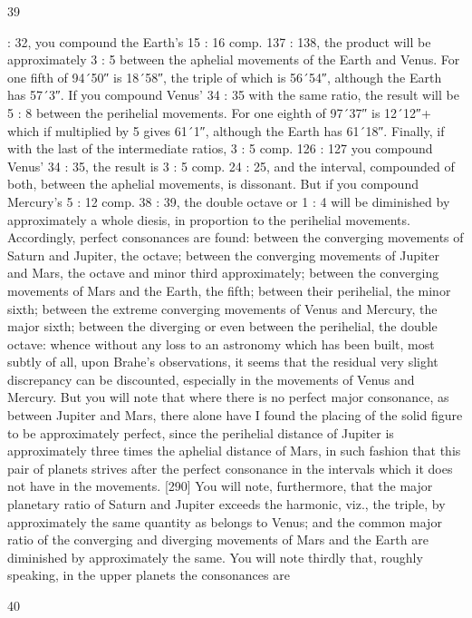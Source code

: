 \documentclass{article}
\begin{document}
39

: 32, you compound the Earth's 15 : 16 comp. 137 : 138, the product will
be approximately 3 : 5 between the aphelial movements of the Earth and
Venus. For one fifth of 94´50″ is 18´58″, the triple of which is 56´54″,
although the Earth has 57´3″. If you compound Venus’ 34 : 35 with the
same ratio, the result will be 5 : 8 between the perihelial movements. For
one eighth of 97´37″ is 12´12″+ which if multiplied by 5 gives 61´1″,
although the Earth has 61´18″. Finally, if with the last of the
intermediate ratios, 3 : 5 comp. 126 : 127 you compound Venus’ 34 : 35,
the result is 3 : 5 comp. 24 : 25, and the interval, compounded of both,
between the aphelial movements, is dissonant. But if you compound
Mercury's 5 : 12 comp. 38 : 39, the double octave or 1 : 4 will be
diminished by approximately a whole diesis, in proportion to the
perihelial movements.
Accordingly, perfect consonances are found: between the converging
movements of Saturn and Jupiter, the octave; between the converging
movements of Jupiter and Mars, the octave and minor third
approximately; between the converging movements of Mars and the
Earth, the fifth; between their perihelial, the minor sixth; between the
extreme converging movements of Venus and Mercury, the major sixth;
between the diverging or even between the perihelial, the double octave:
whence without any loss to an astronomy which has been built, most
subtly of all, upon Brahe's observations, it seems that the residual very
slight discrepancy can be discounted, especially in the movements of
Venus and Mercury.
But you will note that where there is no perfect major consonance, as
between Jupiter and Mars, there alone have I found the placing of the
solid figure to be approximately perfect, since the perihelial distance of
Jupiter is approximately three times the aphelial distance of Mars, in
such fashion that this pair of planets strives after the perfect consonance
in the intervals which it does not have in the movements.
[290] You will note, furthermore, that the major planetary ratio of
Saturn and Jupiter exceeds the harmonic, viz., the triple, by
approximately the same quantity as belongs to Venus; and the common
major ratio of the converging and diverging movements of Mars and the
Earth are diminished by approximately the same. You will note thirdly
that, roughly speaking, in the upper planets the consonances are


40
\end{document}
